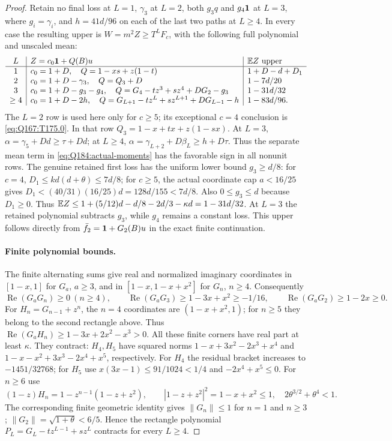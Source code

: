\begin{proof}
Retain no final loss at $L=1$, $\gamma_3$ at $L=2$,
both $g_3q$ and $g_4\mathbf1$ at $L=3$, where $g_i=\gamma_i$,
and $h=41d/96$ on each of the last two
paths at $L\ge4$. In every case the resulting upper is $W=m^2Z\ge T^LF_c$,
with the following full polynomial and unscaled mean:
\begin{equation}\label{eq:Q184:finite-uppers}
\begin{array}{c|l|l}
 L&Z=c_0\mathbf1+Q(B)u&\mathbb E Z\text{ upper}\\\hline
 1&c_0=1+D,\quad Q=1-xs+z(1-t)&1+D-d+D_1\\
 2&c_0=1+D-\gamma_3,\quad Q=Q_3+D&1-7d/20\\
 3&c_0=1+D-g_3-g_4,\quad Q=G_4-tz^3+sz^4+DG_2-g_3
    &1-31d/32\\
 \ge4&c_0=1+D-2h,\quad Q=G_{L+1}-tz^L+sz^{L+1}+DG_{L-1}-h
    &1-83d/96.
\end{array}
\end{equation}
The $L=2$ row is used here only for $c\ge5$; its exceptional
$c=4$ conclusion is \eqref{eq:Q167:T175.0}.
In that row $Q_3=1-x+tx+z(1-sx)$.
At $L=3$, $\alpha=\gamma_5+Dd\ge\tau+Dd$; at $L\ge4$,
$\alpha=\gamma_{L+2}+D\beta_L\ge h+D\tau$.
Thus the separate mean term in \eqref{eq:Q184:actual-moments}
has the favorable sign in all nonunit rows.
The genuine retained first loss has the uniform lower bound $g_3\ge d/8$:
for $c=4$, $D_1\le kd(d+\theta)\le7d/8$; for $c\ge5$,
the actual coordinate cap $a<16/25$ gives
$D_1<(40/31)(16/25)d=128d/155<7d/8$.
Also $0\le g_3\le d$ because $D_1\ge0$.
Thus $\mathbb E Z\le1+(5/12)d-d/8-2d/3-\kappa d=1-31d/32$.
At $L=3$ the retained polynomial subtracts $g_3$, while $g_4$ remains
a constant loss. This upper follows directly from
$\bar f_2=\mathbf1+G_2(B)u$ in the exact finite continuation.

\paragraph{Finite polynomial bounds.}
The finite alternating sums give real and normalized imaginary
coordinates in $[1-x,1]$ for $G_a$, $a\ge3$, and in
$[1-x,1-x+x^2]$ for $G_n$, $n\ge4$.
Consequently
\[
 \operatorname{Re}(G_aG_n)\ge0\ (n\ge4),\qquad
 \operatorname{Re}(G_aG_3)\ge1-3x+x^2\ge-1/16,\qquad
 \operatorname{Re}(G_aG_2)\ge1-2x\ge0.
\]
For $H_n=G_{n-1}+z^n$, the $n=4$ coordinates are
$(1-x+x^2,1)$; for $n\ge5$ they belong to the second rectangle above.
Thus $\operatorname{Re}(G_aH_n)\ge1-3x+2x^2-x^3>0$.
All these finite corners have real part at least $\kappa$.
They contract: $H_4,H_5$ have squared norms
$1-x+3x^2-2x^3+x^4$ and
$1-x-x^2+3x^3-2x^4+x^5$, respectively.
For $H_4$ the residual bracket increases to $-1451/32768$;
for $H_5$ use $x(3x-1)\le91/1024<1/4$ and
$-2x^4+x^5\le0$. For $n\ge6$ use
\[
 (1-z)H_n=1-z^{n-1}(1-z+z^2),\qquad
 |1-z+z^2|^2=1-x+x^2\le1,
 \quad 2\theta^{3/2}+\theta^4<1.
\]
The corresponding finite geometric identity gives $\|G_n\|\le1$
for $n=1$ and $n\ge3$; $\|G_2\|=\sqrt{1+\theta}<6/5$.
Hence the rectangle polynomial
$P_L=G_L-tz^{L-1}+sz^L$ contracts for every $L\ge4$.


\end{proof}
